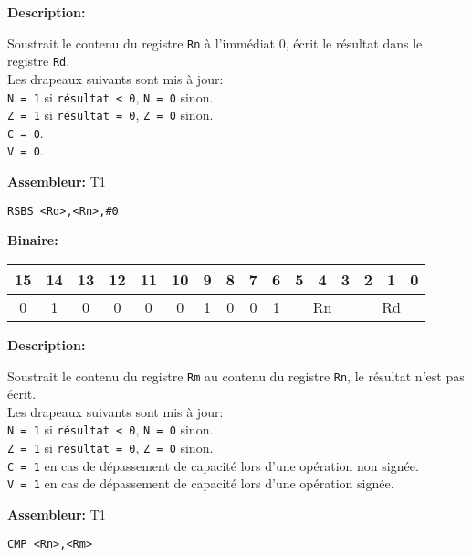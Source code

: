 \documentclass{article}
\begin{document}
    \textbf{Description: }

    Soustrait le contenu du registre \texttt{Rn} à l'immédiat 0, écrit le résultat dans le registre \texttt{Rd}.\\
    Les drapeaux suivants sont mis à jour:\\
    \texttt{N = 1} si \texttt{résultat < 0}, \texttt{N = 0} sinon.\\
    \texttt{Z = 1} si \texttt{résultat = 0}, \texttt{Z = 0} sinon.\\
    \texttt{C = 0}.\\
    \texttt{V = 0}.

    \textbf{Assembleur:} T1

    \begin{lstlisting}
RSBS <Rd>,<Rn>,#0
    \end{lstlisting}

    \textbf{Binaire:}

    \begin{tabular}{| c c c c c c c c c c c c c c c c |}
        \hline
        15 & 14 & 13 & 12 & 11 & 10 & \multicolumn{1}{|c}{9} & 8 & 7 & 6 & \multicolumn{1}{|c}{5} & 4 & 3 & \multicolumn{1}{|c}{2} & 1 & 0 \\
        \hline
        0 & 1 & 0 & 0 & 0 & 0 & \multicolumn{1}{|c}{1} & 0 & 0 & 1 & \multicolumn{3}{|c}{Rn} & \multicolumn{3}{|c|}{Rd} \\
        \hline
    \end{tabular}




    \textbf{Description: }

    Soustrait le contenu du registre \texttt{Rm} au contenu du registre \texttt{Rn}, le résultat n'est pas écrit.\\
    Les drapeaux suivants sont mis à jour:\\
    \texttt{N = 1} si \texttt{résultat < 0}, \texttt{N = 0} sinon.\\
    \texttt{Z = 1} si \texttt{résultat = 0}, \texttt{Z = 0} sinon.\\
    \texttt{C = 1} en cas de dépassement de capacité lors d'une opération non signée.\\
    \texttt{V = 1} en cas de dépassement de capacité lors d'une opération signée.

    \textbf{Assembleur:} T1

    \begin{lstlisting}
CMP <Rn>,<Rm>
    \end{lstlisting}
\end{document}
